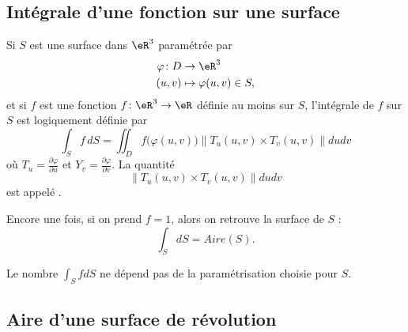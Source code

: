 \subsection{Intégrale d'une fonction sur une surface}

Si $S$ est une surface dans $\eR^3$ paramétrée par
\begin{equation}
    \begin{aligned}
        \varphi\colon D&\to \eR^3 \\
        (u,v)&\mapsto \varphi(u,v)\in S,
    \end{aligned}
\end{equation}
et si $f$ est une fonction $f\colon \eR^3\to \eR$ définie au moins sur $S$, l'intégrale de $f$ sur $S$ est logiquement définie par
\begin{equation}
    \int_S f\,dS=\iint_D f\big( \varphi(u,v) \big)\| T_u(u,v)\times T_v(u,v) \|dudv
\end{equation}
où $T_u=\frac{ \partial \varphi }{ \partial u }$ et $Y_v=\frac{ \partial \varphi }{ \partial v }$. La quantité
\begin{equation}
    \| T_u(u,v)\times T_v(u,v) \|dudv
\end{equation}
est appelé .

Encore une fois, si on prend $f=1$, alors on retrouve la surface de $S$ :
\begin{equation}
    \int_SdS=Aire(S).
\end{equation}

\begin{remark}
    Le nombre $\int_SfdS$ ne dépend pas de la paramétrisation choisie pour $S$.
\end{remark}



\subsection{Aire d'une surface de révolution}

